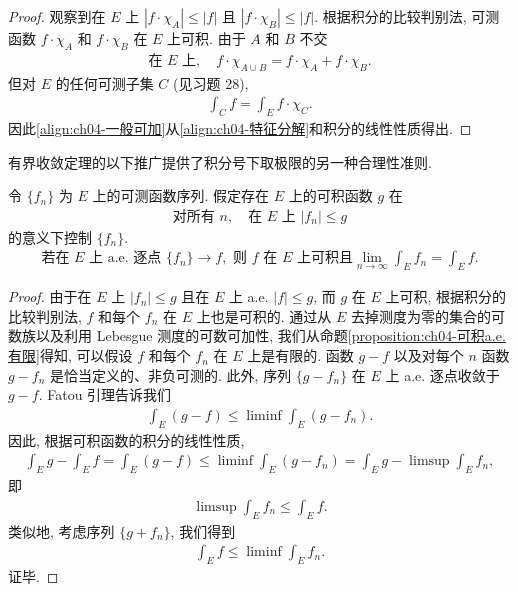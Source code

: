 \documentclass[../../main.tex]{subfiles}
\begin{document}
\begin{proof}
观察到在 $E$ 上 $|f\cdot\chi_{A}|\leqslant|f|$ 且 $|f\cdot\chi_{B}|\leqslant|f|$. 根据积分的比较判别法, 可测函数 $f\cdot\chi_{A}$ 和 $f\cdot\chi_{B}$ 在 $E$ 上可积. 由于 $A$ 和 $B$ 不交
\begin{align}
\text{在 }E\text{ 上},\quad f\cdot\chi_{A\cup B}=f\cdot\chi_{A}+f\cdot\chi_{B}.\label{align:ch04-特征分解}
\end{align}
但对 $E$ 的任何可测子集 $C$ (见习题 28),
\begin{align*}
\int_{C}f=\int_{E}f\cdot\chi_{C}.
\end{align*}
因此\eqref{align:ch04-一般可加}从\eqref{align:ch04-特征分解}和积分的线性性质得出.
\end{proof}

有界收敛定理的以下推广提供了积分号下取极限的另一种合理性准则.

\begin{theorem}\label{theorem:ch04-LDCT}
令 $\{f_{n}\}$ 为 $E$ 上的可测函数序列. 假定存在 $E$ 上的可积函数 $g$ 在
\begin{align*}
\text{对所有 }n,\quad\text{在 }E\text{ 上 }|f_{n}|\leqslant g
\end{align*}
的意义下控制 $\{f_{n}\}$.
\begin{align*}
\text{若在 }E\text{ 上 a.e. 逐点 }\{f_{n}\}\to f,\text{ 则 }f\text{ 在 }E\text{ 上可积且}\lim_{n\to\infty}\int_{E}f_{n}=\int_{E}f.
\end{align*}
\end{theorem}

\begin{proof}
由于在 $E$ 上 $|f_{n}|\leqslant g$ 且在 $E$ 上 a.e. $|f|\leqslant g$, 而 $g$ 在 $E$ 上可积, 根据积分的比较判别法, $f$ 和每个 $f_{n}$ 在 $E$ 上也是可积的. 通过从 $E$ 去掉测度为零的集合的可数族以及利用 Lebesgue 测度的可数可加性, 我们从命题\cref{proposition:ch04-可积a.e.有限}得知, 可以假设 $f$ 和每个 $f_{n}$ 在 $E$ 上是有限的. 函数 $g-f$ 以及对每个 $n$ 函数 $g-f_{n}$ 是恰当定义的、非负可测的. 此外, 序列 $\{g-f_{n}\}$ 在 $E$ 上 a.e. 逐点收敛于 $g-f$. Fatou 引理告诉我们
\begin{align*}
\int_{E}(g-f)\leqslant\liminf\int_{E}(g-f_{n}).
\end{align*}
因此, 根据可积函数的积分的线性性质,
\begin{align*}
\int_{E}g-\int_{E}f=\int_{E}(g-f)\leqslant\liminf\int_{E}(g-f_{n})=\int_{E}g-\limsup\int_{E}f_{n},
\end{align*}
即
\begin{align*}
\limsup\int_{E}f_{n}\leqslant\int_{E}f.
\end{align*}
类似地, 考虑序列 $\{g+f_{n}\}$, 我们得到
\begin{align*}
\int_{E}f\leqslant\liminf\int_{E}f_{n}.
\end{align*}
证毕.
\end{proof}
\end{document}
